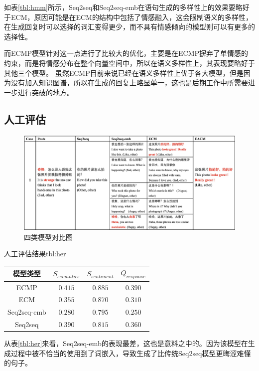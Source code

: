 \documentclass[supercite]{HustGraduPaper}
\theoremstyle{definition}
\begin{document}
如表\ref{tbl:hmm}所示，Seq2seq和Seq2seq-emb在语句生成的多样性上的效果要略好于ECM，原因可能是在ECM的结构中包括了情感融入，这会限制语义的多样性，
在生成回复时可以选择的词汇变得更少，而不具有情感倾向的模型则可以有更多的选择性。

而ECMP模型针对这一点进行了比较大的优化，主要是在ECMP摒弃了单情感的约束，而是将情感分布在整个向量空间中，所以在语义多样性上，其表现要略好于其他三个模型。
虽然ECMP目前来说已经在语义多样性上优于各大模型，但是因为没有加入知识图谱，所以在生成的回复上略显单一，这也是后期工作中所需要进一步进行突破的地方。


\subsection{人工评估}

\begin{figure}[H] %
  \centering %
  \includegraphics[width=1\textwidth]{images/4models.png} %
  \caption{四类模型对比图} %
  \label{Fig.4models} %
\end{figure}

\begin{generaltab}{人工评估结果}{tbl:her}
  \begin{tabular}{c|ccc}
    \toprule
    模型类型 & $S_{semantics}$ & $S_{sentiment}$ & $Q_{response}$\\
    \midrule
    ECMP & $0.415$ & $0.885$ & $0.390$\\
    ECM & $0.355$ & $0.870$ & $0.310$\\
    Seq2seq-emb & $0.280$ & $0.795$ & $0.250$\\
    Seq2seq & $0.390$ & $0.815$ & $0.360$\\
    \bottomrule
  \end{tabular}
\end{generaltab}
从表\ref{tbl:her}来看，Seq2seq-emb的表现最差，这也是意料之中的。因为该模型在生成过程中被不恰当的使用到了词嵌入，导致生成了比传统Seq2seq模型更晦涩难懂的句子。
\end{document}
